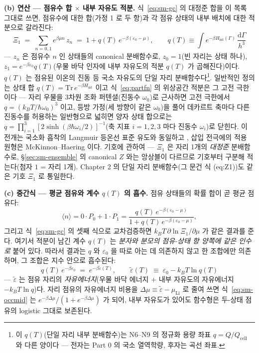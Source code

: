 \documentclass[11pt,a4paper]{article}
\newcommand{\dd}{\mathrm{d}}
\newcommand{\cell}{\mathrm{cell}}
\begin{document}
\textbf{(b) 연산 --- 점유수 합 $\times$ 내부 자유도 적분.} 식~\eqref{eq:sm-gc} 의 대정준 합을 이 목록
그대로 쓰면, 점유수에 대한 합(가정 1 로 두 항)과 각 점유 상태의 내부 배치에 대한 적분으로 갈라진다:
\begin{equation}
\Xi_1\;=\;\sum_{n=0,1}e^{\beta\mu n}\,z_n
\;=\;1+q(T)\,e^{-\beta(\varepsilon_0-\mu)},
\qquad
q(T)\equiv\int e^{-\beta H_\mathrm{int}(\Gamma)}\,\frac{\dd\Gamma}{h^3}
\label{eq:partfn}
\end{equation}
--- $z_n$ 은 점유수 $n$ 인 상태들의 canonical 분배함수로, $z_0=1$(빈 자리는 상태 하나),
$z_1=e^{-\beta\varepsilon_0}q(T)$(우물 바닥 인자에 내부 자유도의 적분 $q(T)$ 가 곱해진다)이다.
$q(T)$ 는 점유된 이온의 진동 등 국소 자유도의 단일 자리 분배함수다\footnote{이 $q(T)$(단일 자리 내부 분배함수)는 N6--N9 의 정규화 용량 좌표 $q{=}Q/Q_\cell$ 와 다른 양이다 --- 전자는 Part 0 의 국소 열역학량, 후자는 곡선 좌표.}. 일반적인 정의는 상태
합 $q(T)=\mathrm{Tr}\,e^{-\beta H_\mathrm{int}}$ 이고 식~\eqref{eq:partfn} 의 위상공간 적분은 그 고전
극한이다 — 자리 우물을 3차원 조화 퍼텐셜(진동수 $\omega_0$)로 근사하면 고전 극한에서
$q=(k_BT/\hbar\omega_0)^3$ 이고, 등방 가정(세 방향이 같은 $\omega_0$)을 풀어 데카르트 축마다 다른
진동수를 허용하는 일반형으로 넓히면 양자 상태 합으로는
$q=\prod_{i=1}^{3}[2\sinh(\beta\hbar\omega_i/2)]^{-1}$(축 지표 $i=1,2,3$ 마다 진동수 $\omega_i$)로 닫힌다. 이 전개는 국소화
흡착의 Langmuir 등온선 표준 유도와 동일하고 \cite{hill1960,fowler1939,mcquarrie1976}, 삽입 전극에의
적용 원형은 McKinnon--Haering \cite{mckinnon1983} 이다. 기호에 관하여 --- $\Xi_1$ 은 자리 1개의
\emph{대정준} 분배함수로, \S\ref{sec:sm-ensemble} 의 canonical $Z$ 와는 앙상블이 다르므로 기호부터
구분해 적는다(첨자 $1$ = 자리 1개). Chapter 2 의 단일 자리 분배함수(그 문건 식 (eq:Z1))도 같은 기호
$\Xi_1$ 로 통일한다.

\textbf{(c) 중간식 --- 평균 점유와 계수 $q(T)$ 의 흡수.} 점유 상태들의 확률 합이 곧 평균 점유다:
\begin{equation}
\langle n\rangle=0\cdot P_0+1\cdot P_1
=\frac{q(T)\,e^{-\beta(\varepsilon_0-\mu)}}{1+q(T)\,e^{-\beta(\varepsilon_0-\mu)}},
\label{eq:sm-occmid}
\end{equation}
그리고 식~\eqref{eq:sm-gc} 의 셋째 식으로 교차검증하면 $k_BT\,\partial\ln\Xi_1/\partial\mu$ 가 같은
결과를 준다. 여기서 적분이 남긴 계수 $q(T)$ 는 \emph{분자와 분모의 점유-상태 항 양쪽에 같은 인수로}
붙어 있다. 따라서 결과는 $q$ 와 $\varepsilon_0$ 을 따로 아는 데 의존하지 않고 한 조합에만 의존하며,
그 조합은 지수 안으로 흡수된다:
\begin{equation}
q(T)\,e^{-\beta\varepsilon_0}\;=\;e^{-\beta\tilde\varepsilon(T)},
\qquad
\tilde\varepsilon(T)\;\equiv\;\varepsilon_0-k_BT\ln q(T)
\label{eq:sm-epstilde}
\end{equation}
--- $\tilde\varepsilon$ 는 점유 자리의 \emph{자유에너지}(우물 바닥 에너지 $+$ 내부 자유도의 자유에너지
$-k_BT\ln q$)다. 자리 점유의 자유에너지 비용을 $\Delta\mu\equiv\tilde\varepsilon-\mu_\mathrm{Li}$ 로
줄여 쓰면 식~\eqref{eq:sm-occmid} 는 $e^{-\beta\Delta\mu}/(1+e^{-\beta\Delta\mu})$ 가 되어, 내부
자유도가 있어도 함수형은 두-상태 점유의 logistic 그대로 보존된다.
\end{document}
